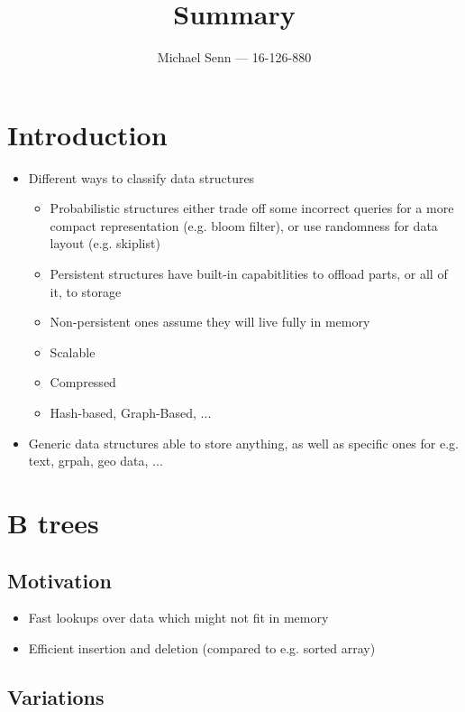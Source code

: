 \documentclass[a4paper]{scrreprt}
\title{Summary}
\author{Michael Senn \maillink{michael.senn@students.unibe.ch} --- 16-126-880}
\date{\printdate}
\begin{document}
\maketitle

\chapter{Introduction}

\begin{itemize}
		\item Different ways to classify data structures
				\begin{itemize}
						\item Probabilistic structures either trade off some
								incorrect queries for a more compact
								representation (e.g. bloom filter), or use
								randomness for data layout (e.g. skiplist)
						\item Persistent structures have built-in capabitlities
								to offload parts, or all of it, to storage
						\item Non-persistent ones assume they will live fully
								in memory
						\item Scalable
						\item Compressed
						\item Hash-based, Graph-Based, ...
				\end{itemize}
		\item Generic data structures able to store anything, as well as
				specific ones for e.g. text, grpah, geo data, ...
\end{itemize}

\chapter{B trees}

\section{Motivation}

\begin{itemize}
		\item Fast lookups over data which might not fit in memory
		\item Efficient insertion and deletion (compared to e.g. sorted array)
\end{itemize}

\section{Variations}
\end{document}
